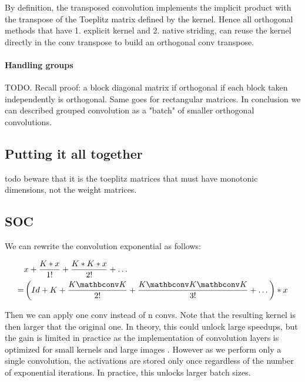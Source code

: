         By definition, the transposed convolution implements the implicit product with the transpose of the Toeplitz matrix defined by the kernel. Hence all orthogonal methods that have 1. explicit kernel and 2. native striding, can reuse the kernel directly in the conv transpose to build an orthogonal conv transpose.

        \paragraph{Handling groups} TODO. Recall proof: a block diagonal matrix if orthogonal if each block taken independently is orthogonal. Same goes for rectangular matrices. In conclusion we can described grouped convolution as a "batch" of smaller orthogonal convolutions.

    \subsection{Putting it all together}
        todo beware that it is the toeplitz matrices that must have monotonic dimensions, not the weight matrices.

    \subsection{SOC}

        \begin{theorem}

            We can rewrite the convolution exponential as follows:

            \begin{align}
                & x + \frac{K*x}{1!} + \frac{K*K*x}{2!} + \dots \\
                = & \left(Id + K + \frac{K \mathbconv K}{2!} + \frac{K \mathbconv K \mathbconv K }{3!} + \dots \right) * x            
            \end{align}
        \end{theorem}
            Then we can apply one conv instead of n convs. Note that the resulting kernel is then larger that the original one. In theory, this could unlock large speedups, but the gain is limited in practice as the implementation of convolution layers is optimized for small kernels and large images \cite{ding2022scaling}. However as we perform only a single convolution, the activations are stored only once regardless of the number of exponential iterations. In practice, this unlocks larger batch sizes.

